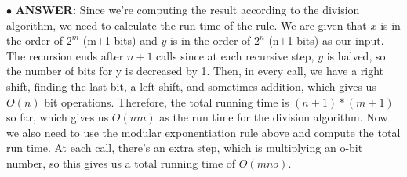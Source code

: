 \documentclass{article}
\newenvironment{myitem}{\begin{list}{$\bullet$}
{\setlength{\itemsep}{-0pt}
\setlength{\topsep}{0pt}
\setlength{\labelwidth}{0pt}
\setlength{\leftmargin}{10pt}
\setlength{\parsep}{-0pt}
\setlength{\itemsep}{0pt}
\setlength{\partopsep}{0pt}}}%
{\end{list}}
\begin{document}
\begin{myitem}
{\bfseries ANSWER: }Since we're computing the result according to the division algorithm, we need to calculate the run time of the rule. We are given that $x$ is in the order of $2^m$ (m+1 bits) and $y$ is in the order of $2^n$ (n+1 bits) as our input. The recursion ends after $n+1$ calls since at each recursive step, $y$ is halved, so the number of bits for y is decreased by 1. Then, in every call, we have a right shift, finding the last bit, a left shift, and sometimes addition, which gives us $O(n)$ bit operations. Therefore, the total running time is $(n+1)*(m+1)$ so far, which gives us $O(nm)$ as the run time for the division algorithm. Now we also need to use the modular exponentiation rule above and compute the total run time. At each call, there's an extra step, which is multiplying an o-bit number, so this gives us a total running time of $O(mno)$.\\

\end{myitem}
\end{document}
